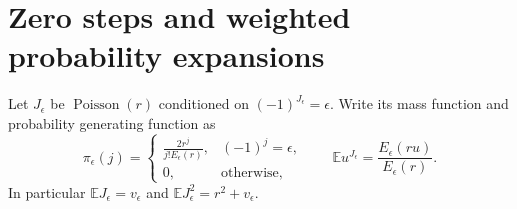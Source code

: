 \documentclass[11pt,letterpaper]{article}
\theoremstyle{remark}\newtheorem{remark}[theorem]{Remark}
\newcommand{\E}{\mathbb E}\newcommand{\Pp}{\mathbb P}
\newcommand{\Poi}{\operatorname{Poisson}}\newcommand{\Normal}{\mathcal N}
\begin{document}
\section{Zero steps and weighted probability expansions}\label{lcw:sec:poisson}
Let $J_\epsilon$ be $\Poi(r)$ conditioned on $(-1)^{J_\epsilon}=\epsilon$. Write its mass function and probability generating function as
\begin{equation}\label{lcw:eq:poisson}
 \pi_\epsilon(j)=
 \begin{cases}\displaystyle\frac{2r^j}{j!E_\epsilon(r)},&(-1)^j=\epsilon,\\[4pt]0,&\text{otherwise},\end{cases}
 \qquad
 \E u^{J_\epsilon}=\frac{E_\epsilon(ru)}{E_\epsilon(r)}.
\end{equation}
In particular $\E J_\epsilon=v_\epsilon$ and $\E J_\epsilon^2=r^2+v_\epsilon$.
\end{document}
